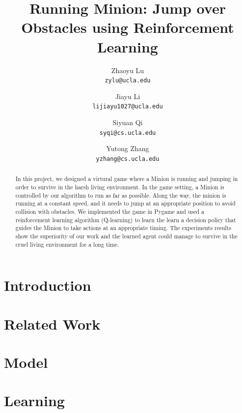 \documentclass{acmsiggraph}
\title{Running Minion:  Jump over Obstacles using Reinforcement Learning}
\author{
  Zhaoyu Lu \\
  \texttt{zylu@ucla.edu}
  \and
  Jiayu Li \\
  \texttt{lijiayu1027@ucla.edu}
  \and
  Siyuan Qi \\
  \texttt{syqi@cs.ucla.edu}
  \and
  Yutong Zhang \\
  \texttt{yzhang@cs.ucla.edu}
  }
\begin{document}


\maketitle

\begin{abstract}

In this project, we designed a virtural game where a Minion is running and jumping in order to survive in the harsh living environment. In the game setting, a Minion is controlled by our algorithm to run as far as possible. Along the way, the minion is running at a constant speed, and it needs to jump at an appropriate position to avoid collision with obstacles. We implemented the game in Pygame and used a reinforcement learning algorithm (Q-learning) to learn the learn a decision policy that guides the Minion to take actions at an appropriate timing. The experiments results show the superiority of our work and the learned agent could manage to survive in the cruel living environment for a long time.

\end{abstract}

\section{Introduction}


\section{Related Work}


\section{Model}


\section{Learning}
\end{document}
